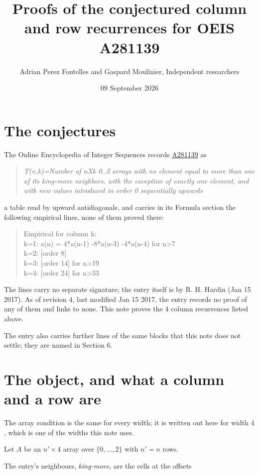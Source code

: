 \documentclass[11pt]{article}
\title{Proofs of the conjectured column and row recurrences for OEIS A281139}
\author{Adrian Perez Fontelles and Gaspard Moulinier, Independent researchers}
\date{09 September 2026}
\theoremstyle{definition}
\begin{document}
\maketitle
\section{The conjectures}

The Online Encyclopedia of Integer Sequences records \href{https://oeis.org/A281139}{A281139} as

\begin{quote}\itshape T(n,k)=Number of nXk 0..2 arrays with no element equal to more than one of its king-move neighbors, with the exception of exactly one element, and with new values introduced in order 0 sequentially upwards\end{quote}

a table read by upward antidiagonals, and carries in its Formula section the following empirical lines, none of them proved there:

\begin{quote}\ttfamily Empirical for column k:\\
k=1: a(n) = 4*a(n-1) -8*a(n-3) -4*a(n-4) for n>7\\k=2: [order 8]\\k=3: [order 14] for n>19\\k=4: [order 24] for n>33\end{quote}

The lines carry no separate signature; the entry itself is by R. H. Hardin (Jan 15 2017). As of revision 4, last modified Jan 15 2017, the entry records no proof of any of them and links to none. This note proves the 4 column recurrences listed above.

The entry also carries further lines of the same blocks that this note does not settle; they are named in Section 6.

\section{The object, and what a column and a row are}

The array condition is the same for every width; it is written out here for width $4$, which is one of the widths this note uses.

Let $A$ be an $n' \times 4$ array over $\{0,\dots,2\}$ with $n' = n$ rows.

The entry's neighbours, {\itshape king-move}, are the cells at the offsets
\end{document}
